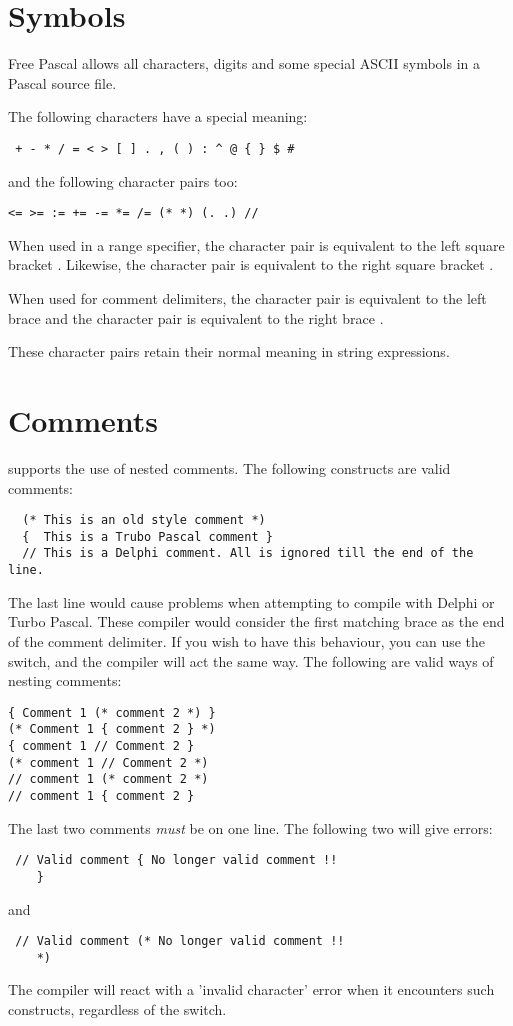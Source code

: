 \documentclass{report}
\begin{document}
\section{Symbols}
Free Pascal allows all characters, digits and some special ASCII symbols
in a Pascal source file.



The following characters have a special meaning:
\begin{verbatim}
 + - * / = < > [ ] . , ( ) : ^ @ { } $ #
\end{verbatim}
and the following character pairs too:
\begin{verbatim}
<= >= := += -= *= /= (* *) (. .) // 
\end{verbatim}
When used in a range specifier, the character pair  is equivalent to 
the left square bracket \var{[}. Likewise, the character pair  is 
equivalent to the right square bracket \var{]}. 

When used for comment delimiters, the character pair \var{(*} is equivalent 
to the  left brace \var{\{} and the character pair \var{*)} is equivalent 
to the right brace \var{\}}. 

These character pairs retain their normal meaning in string expressions.
\section{Comments}

\fpc supports the use of nested comments. The following constructs are valid
comments:
\begin{verbatim}
  (* This is an old style comment *)
  {  This is a Trubo Pascal comment }
  // This is a Delphi comment. All is ignored till the end of the line.
\end{verbatim}
The last line would cause problems when attempting to compile with Delphi or
Turbo Pascal. These compiler would consider the first matching brace 
\var{\}} as the end of the comment delimiter. If you wish to have this
behaviour, you can use the  switch, and the \fpc compiler will 
act the same way.
The following are valid ways of nesting comments:
\begin{verbatim}
{ Comment 1 (* comment 2 *) }
(* Comment 1 { comment 2 } *)
{ comment 1 // Comment 2 }
(* comment 1 // Comment 2 *)
// comment 1 (* comment 2 *)
// comment 1 { comment 2 }
\end{verbatim}
The last two comments {\em must} be on one line. The following two will give
errors:
\begin{verbatim}
 // Valid comment { No longer valid comment !!
    }                     
\end{verbatim}
and
\begin{verbatim}
 // Valid comment (* No longer valid comment !!
    *)                     
\end{verbatim}
The compiler will react with a 'invalid character' error when it encounters
such constructs, regardless of the  switch.
\end{document}
